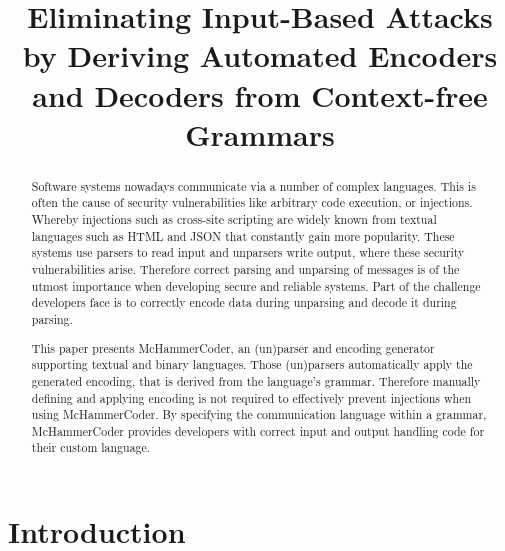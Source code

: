 \documentclass[conference]{IEEEtran}
\newcommand{\punchline}[1]{\textbf{Punch line: #1}}
\renewcommand{\punchline}[1]{}
\begin{document}
\title{Eliminating Input-Based Attacks by Deriving Automated Encoders and Decoders from Context-free Grammars}

\author{
}


\maketitle

\IEEEpeerreviewmaketitle

\begin{abstract}
Software systems nowadays communicate via a number of complex languages.
This is often the cause of security vulnerabilities like arbitrary code execution, or injections.
Whereby injections such as cross-site scripting are widely known from textual languages such as HTML and JSON that constantly gain more popularity.
These systems use parsers to read input and unparsers write output, where these security vulnerabilities arise.
Therefore correct parsing and unparsing of messages is of the utmost importance when developing secure and reliable systems.
Part of the challenge developers face is to correctly encode data during unparsing and decode it during parsing.

This paper presents McHammerCoder, an (un)parser and encoding generator supporting textual and binary languages.
Those (un)parsers automatically apply the generated encoding, that is derived from the language's grammar.
Therefore manually defining and applying encoding is not required to effectively prevent injections when using McHammerCoder.
By specifying the communication language within a grammar, McHammerCoder provides developers with correct input and output handling code for their custom language.
\end{abstract}

\section{Introduction}
\punchline{String Concat is the problem}
\end{document}
